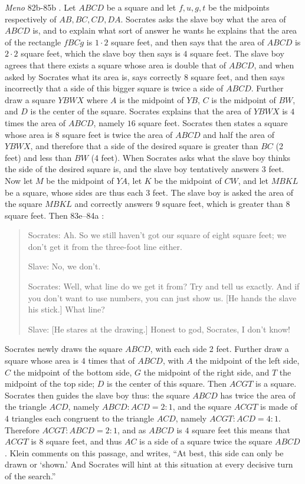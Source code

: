 \documentclass{article}
\theoremstyle{definition}
\begin{document}
{\em Meno} 82b-85b \cite[pp.~102--111]{beresford}. Let $ABCD$ be a square and let $f,u,g,t$ be the midpoints respectively of
$AB,BC,CD,DA$. Socrates asks the slave boy what the area of $ABCD$ is, and to explain what sort of answer he wants he explains that the area of the rectangle
$fBCg$ is $1 \cdot 2$ square feet, and then says that the area of $ABCD$ is $2 \cdot 2$ square feet, which the slave boy then says is $4$ square feet.
The slave boy agrees that there exists a square whose area is double that of $ABCD$, and when asked by Socrates what its area is, says correctly $8$ square feet, and then
says incorrectly that a side of this bigger square is twice a side of $ABCD$. 
Further draw a square $YBWX$ where $A$ is the midpoint of $YB$, $C$ is the midpoint of $BW$, and $D$ is the center of the square.
Socrates explains that the area of $YBWX$ is $4$ times the area of $ABCD$, namely $16$ square feet.
Socrates then states a square whose area is $8$ square feet is twice the area of $ABCD$ and half the area of $YBWX$, and therefore that a side of the desired square is
greater than $BC$ (2 feet) and less than $BW$ (4 feet). When Socrates asks what the slave boy thinks the side of the desired square is, and the slave boy tentatively answers
$3$ feet. Now let $M$ be the midpoint of $YA$, let $K$ be the midpoint of $CW$, and let $MBKL$ be a square, whose sides are thus each $3$ feet.
The slave boy is asked the area of the square $MBKL$ and correctly answers $9$ square feet, which is greater than $8$ square feet. Then 83e--84a \cite[p.~108]{beresford}:

\begin{quote}
Socrates: Ah. So we still haven't got our square of eight square feet; we don't get it from the three-foot line either.

Slave: No, we don't.

Socrates: Well, what line do we get it from? Try and tell us exactly. And if you don't want to use numbers, you can just show us. [He hands the slave his stick.] What line?

Slave: [He stares at the drawing.] Honest to god, Socrates, I don't know!
\end{quote}

Socrates newly draws the square $ABCD$, with each side  2 feet. Further draw a square whose area is $4$ times that of $ABCD$, with $A$ the midpoint of the left side, $C$ the midpoint
of the bottom side, $G$ the midpoint of the right side, and $T$ the midpoint of the top side; $D$ is the center of this square. Then $ACGT$ is a square. Socrates then guides
the slave boy thus: the square $ABCD$ has twice the area of the triangle $ACD$, namely
$ABCD:ACD = 2:1$,
and the square $ACGT$ is made of $4$ triangles each congruent to the triangle $ACD$, namely $ACGT:ACD = 4:1$. Therefore $ACGT:ABCD = 2:1$, and as $ABCD$ is
$4$ square feet this means that $ACGT$ is $8$ square feet, and thus $AC$ is a side of a square twice the square $ABCD$.  
Klein \cite[pp.~99--102]{meno} comments on this passage, and writes, ``At best, this side can only be drawn or `shown.' And Socrates
will hint at this situation at every decisive turn of the search.'' 
\end{document}
